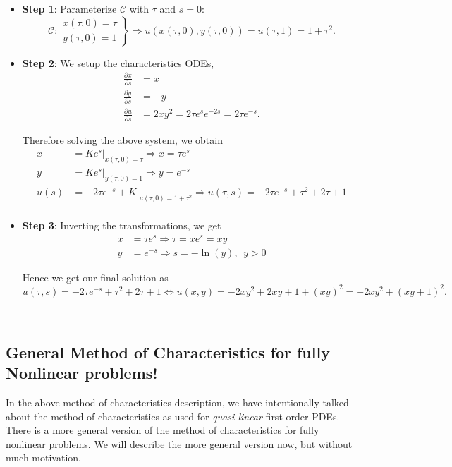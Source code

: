 \begin{itemize}
\item[] {\bf{Step 1}}: Parameterize $\mathscr{C}$ with $\tau$ and $s=0$:
$$\mathscr{C}: \left. \begin{array}{c} x(\tau,0) = \tau \\ y(\tau,0) = 1 \end{array}\right\} \Rightarrow u(x(\tau,0),y(\tau,0))=u(\tau,1) = 1+\tau^2.$$

\item[] {\bf{Step 2}}: We setup the characteristics ODEs,
\begin{align*}
\frac{\partial x}{\partial s} &= x \\
\frac{\partial y}{\partial s} &= -y \\
\frac{\partial u}{\partial s} &= 2xy^2 = 2 \tau e^s e^{-2s} = 2\tau e^{-s}.
\end{align*}

Therefore solving the above system, we obtain
\begin{align*}
x &= Ke^{s}\Big|_{x(\tau,0)=\tau} \Rightarrow x=\tau e^s \\
y &= Ke^{s}\Big|_{y(\tau,0)=1} \Rightarrow y=e^{-s} \\
u(s) &= -2\tau e^{-s}+K\Big|_{u(\tau,0)=1+\tau^2} \Rightarrow u(\tau,s) = -2\tau e^{-s} + \tau^2 +2\tau + 1\\
\end{align*}

\item[] {\bf{Step 3}}: Inverting the transformations, we get 
\begin{align*}
x &= \tau e^s \Rightarrow \tau = xe^s = xy \\
y&= e^{-s} \Rightarrow s = -\ln(y),\ \ y>0 
\end{align*}

Hence we get our final solution as 
$$u(\tau,s) = -2\tau e^{-s} + \tau^2 +2\tau + 1 \Leftrightarrow  u(x,y) = -2xy^2 + 2xy + 1 + (xy)^2 = -2xy^2 + (xy+1)^2.$$

\end{itemize} $ $ \\ 

%
%
\subsection{General Method of Characteristics for fully Nonlinear problems!}

In the above method of characteristics description, we have intentionally talked about the method of characteristics as used for \emph{quasi-linear} first-order PDEs. There is a more general version of the method of characteristics for fully nonlinear problems. We will describe the more general version now, but without much motivation. \\

